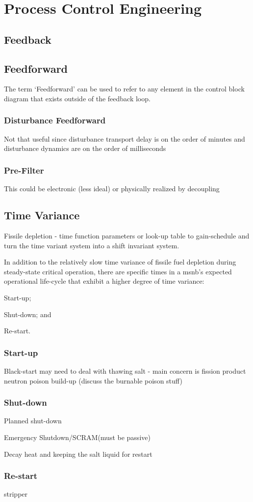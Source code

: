 \chapter{Process Control Engineering}
\label{Chapter:Controls}

\section{Feedback}

\section{Feedforward}
The term `Feedforward' can be used to refer to any element in the control block diagram that exists outside of the feedback loop.

\subsection{Disturbance Feedforward}
Not that useful since disturbance transport delay is on the order of minutes and disturbance dynamics are on the order of milliseconds

\subsection{Pre-Filter}
This could be electronic (less ideal) or physically realized by decoupling 


\section{Time Variance}
Fissile depletion - time function parameters or look-up table to gain-schedule and turn the time variant system into a shift invariant system.

In addition to the relatively slow time variance of fissile fuel depletion during steady-state critical operation, there are specific times in a \acs{msnb}'s expected operational life-cycle that exhibit a higher degree of time variance: 
\begin{enumerate*}
\item Start-up; \item Shut-down; and \item{Re-start}.
\end{enumerate*}

\subsection{Start-up}
Black-start may need to deal with thawing salt - main concern is fission product neutron poison build-up (discuss the burnable poison stuff)

\subsection{Shut-down}
Planned shut-down

Emergency Shutdown/SCRAM(must be passive)

Decay heat and keeping the salt liquid for restart

\subsection{Re-start}
\Xe stripper


